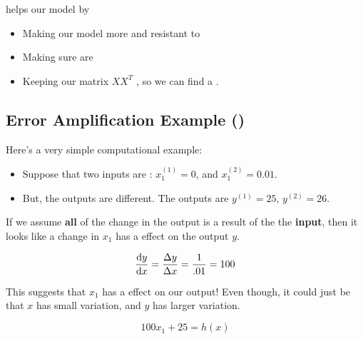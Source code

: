         \begin{concept}
             helps  our model by
            
            \begin{itemize}
                \item Making our model more  and resistant to 
                \item Making sure  are 
                \item Keeping our matrix $XX^T$ , so we can find a .
            \end{itemize}
        \end{concept}

        \phantom{}

        \subsection{Error Amplification Example ()}

            Here's a very simple computational example:

            \begin{itemize}
                \item \miniex Suppose that two inputs are : $x_1^{(1)}=0$, and $x_1^{(2)}=0.01$. 
                \item But, the outputs are  different.  The outputs are $y^{(1)}=25$, $y^{(2)}=26$.
            \end{itemize}

            If we assume \textbf{all} of the change in the output is a result of the the \textbf{input}, then it looks like a  change in $x_1$ has a  effect on the output $y$.

            \begin{equation}
                \frac{\dd y}{\dd x} = \frac{\Delta y}{\Delta x} = \frac{1}{.01} = 100
            \end{equation}
    
            This suggests that $x_1$ has a  effect on our output! Even though, it could just be that $x$ has small variation, and $y$ has larger variation.
    
            \begin{equation}
                100 x_1 + 25 = h(x)
            \end{equation}

